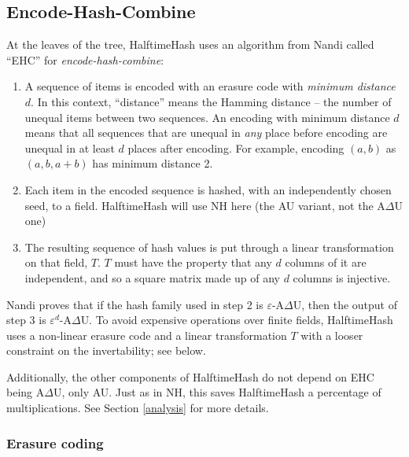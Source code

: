 \documentclass[sigconf, nonacm]{acmart}
\begin{document}

\subsection{Encode-Hash-Combine}

At the leaves of the tree, HalftimeHash uses an algorithm from Nandi called ``EHC'' for {\em encode-hash-combine}: \cite{ehc-nandi}

\begin{enumerate}
\item A sequence of items is encoded with an erasure code with {\em minimum distance $d$}.
  In this context, ``distance'' means the Hamming distance -- the number of unequal items between two sequences.
  An encoding with minimum distance $d$ means that all sequences that are unequal in {\em any} place before encoding are unequal in at least $d$ places after encoding.
  For example, encoding $(a,b)$ as $(a,b,a+b)$ has minimum distance 2.
\item Each item in the encoded sequence is hashed, with an independently chosen seed, to a field.
  HalftimeHash will use NH here (the AU variant, not the A$\Delta$U one)
\item The resulting sequence of hash values is put through a linear transformation on that field, $T$.
  $T$ must have the property that any $d$ columns of it are independent, and so a square matrix made up of any $d$ columns is injective.
\end{enumerate}

Nandi proves that if the hash family used in step 2 is $\varepsilon$-A$\Delta$U, then the output of step 3 is $\varepsilon^d$-A$\Delta$U.
To avoid expensive operations over finite fields, HalftimeHash uses a non-linear erasure code and a linear transformation $T$ with a looser constraint on the invertability; see below.

Additionally, the other components of HalftimeHash do not depend on EHC being A$\Delta$U, only AU.
Just as in NH, this saves HalftimeHash a percentage of multiplications.
See Section \ref{analysis} for more details.

\subsubsection{Erasure coding}
\end{document}
